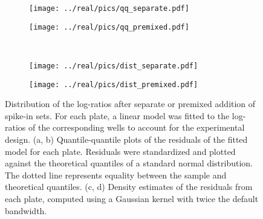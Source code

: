 \documentclass{article}
\begin{document}
\begin{figure}[btp]
    \begin{center}
        \begin{subfigure}{0.49\textwidth}
            \texttt{[image: ../real/pics/qq\_separate.pdf]}
            \caption{}
        \end{subfigure}
        \begin{subfigure}{0.49\textwidth}
            \texttt{[image: ../real/pics/qq\_premixed.pdf]}
            \caption{}
        \end{subfigure} \\[0.1in]
        \begin{subfigure}{0.49\textwidth}
            \texttt{[image: ../real/pics/dist\_separate.pdf]}
            \caption{}
        \end{subfigure}
        \begin{subfigure}{0.49\textwidth}
            \texttt{[image: ../real/pics/dist\_premixed.pdf]}
            \caption{}
        \end{subfigure}
    \end{center}
    \caption{
        Distribution of the log-ratios after separate or premixed addition of spike-in sets.
        For each plate, a linear model was fitted to the log-ratios of the corresponding wells to account for the experimental design.
        (a, b) Quantile-quantile plots of the residuals of the fitted model for each plate.
        Residuals were standardized and plotted against the theoretical quantiles of a standard normal distribution.
        The dotted line represents equality between the sample and theoretical quantiles.
        (c, d) Density estimates of the residuals from each plate, computed using a Gaussian kernel with twice the default bandwidth.
    }
\end{figure}
\end{document}
